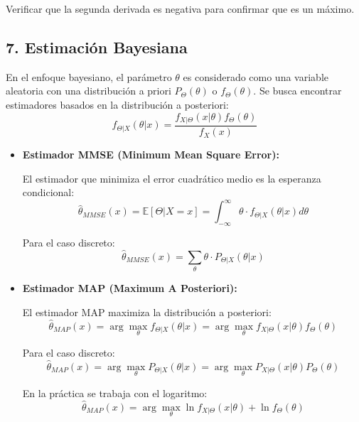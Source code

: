\documentclass[
  11pt,
  letterpaper,
   addpoints,
   answers
  ]{exam}
\begin{document}
Verificar que la segunda derivada es negativa para confirmar que es un máximo.

\subsection*{7. Estimación Bayesiana}

En el enfoque bayesiano, el parámetro $\theta$ es considerado como una variable aleatoria con una distribución a priori $P_{\Theta}(\theta)$ o $f_{\Theta}(\theta)$. Se busca encontrar estimadores basados en la distribución a posteriori:
\[
f_{\Theta|X}(\theta|x) = \frac{f_{X|\Theta}(x|\theta) f_{\Theta}(\theta)}{f_X(x)}
\]
\begin{itemize}
\item \textbf{Estimador MMSE (Minimum Mean Square Error):}

El estimador que minimiza el error cuadrático medio es la esperanza condicional:
\[
\hat{\theta}_{MMSE}(x) = \mathbb{E}[\Theta|X=x] = \int_{-\infty}^{\infty} \theta \cdot f_{\Theta|X}(\theta|x) d\theta
\]

Para el caso discreto:
\[
\hat{\theta}_{MMSE}(x) = \sum_{\theta} \theta \cdot P_{\Theta|X}(\theta|x)
\]

\item \textbf{Estimador MAP (Maximum A Posteriori):}

El estimador MAP maximiza la distribución a posteriori:
\[
\hat{\theta}_{MAP}(x) = \arg\max_{\theta} f_{\Theta|X}(\theta|x) = \arg\max_{\theta} f_{X|\Theta}(x|\theta) f_{\Theta}(\theta)
\]

Para el caso discreto:
\[
\hat{\theta}_{MAP}(x) = \arg\max_{\theta} P_{\Theta|X}(\theta|x) = \arg\max_{\theta} P_{X|\Theta}(x|\theta) P_{\Theta}(\theta)
\]

En la práctica se trabaja con el logaritmo:
\[
\hat{\theta}_{MAP}(x) = \arg\max_{\theta} \ln f_{X|\Theta}(x|\theta) + \ln f_{\Theta}(\theta)
\]
\end{itemize}
\end{document}

